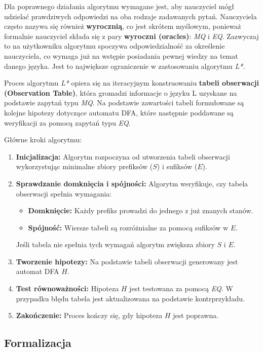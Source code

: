 Dla poprawnego działania algorytmu wymagane jest, aby nauczyciel mógł udzielać prawdziwych odpowiedzi na oba rodzaje zadawanych pytań. Nauczyciela często nazywa się również \textbf{wyrocznią}, co jest skrótem myślowym, ponieważ formalnie nauczyciel składa się z pary \textbf{wyroczni (oracles)}: \textit{MQ} i \textit{EQ}. Zazwyczaj to na użytkowniku algorytmu spoczywa odpowiedzialność za określenie nauczyciela, co wymaga już na wstępie posiadania pewnej wiedzy na temat danego języka. Jest to największe ograniczenie w zastosowaniu algorytmu \textit{L*}.

Proces algorytmu \textit{L*} opiera się na iteracyjnym konstruowaniu \textbf{tabeli obserwacji (Observation Table)}, która gromadzi informacje o języku L uzyskane na podstawie zapytań typu \textit{MQ}. Na podstawie zawartości tabeli formułowane są kolejne hipotezy dotyczące automatu DFA, które następnie poddawane są weryfikacji za pomocą zapytań typu \textit{EQ}.

Główne kroki algorytmu:
\begin{enumerate}
    \item \textbf{Inicjalizacja:} Algorytm rozpoczyna od utworzenia tabeli obserwacji wykorzystując minimalne zbiory prefiksów (\( S \)) i sufiksów (\( E \)).
    \item \textbf{Sprawdzanie domknięcia i spójności:} Algorytm weryfikuje, czy tabela obserwacji spełnia wymagania:
    \begin{itemize}
        \item \textbf{Domknięcie:} Każdy prefiks prowadzi do jednego z już znanych stanów.
        \item \textbf{Spójność:} Wiersze tabeli są rozróżnialne za pomocą sufiksów w \( E \).
    \end{itemize}
    Jeśli tabela nie spełnia tych wymagań algorytm zwiększa zbiory \( S \) i \( E \).
    \item \textbf{Tworzenie hipotezy:} Na podstawie tabeli obserwacji generowany jest automat DFA \( H \).
    \item \textbf{Test równoważności:} Hipoteza \( H \) jest testowana za pomocą \textit{EQ}. W przypadku błędu tabela jest aktualizowana na podstawie kontrprzykładu.
    \item \textbf{Zakończenie:} Proces kończy się, gdy hipoteza \( H \) jest poprawna.
\end{enumerate}

\subsection{Formalizacja}


